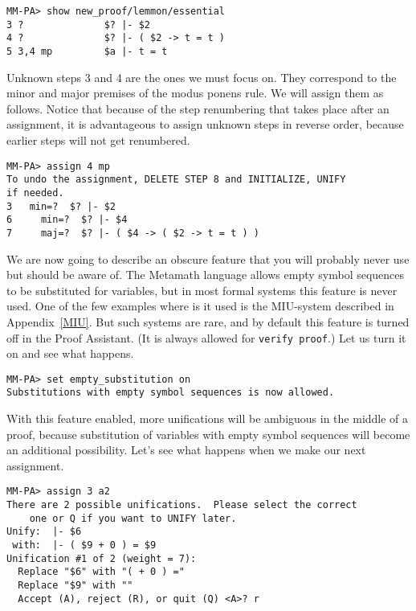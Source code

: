 \begin{verbatim}
MM-PA> show new_proof/lemmon/essential
3 ?              $? |- $2
4 ?              $? |- ( $2 -> t = t )
5 3,4 mp         $a |- t = t
\end{verbatim}

Unknown steps 3 and 4 are the ones we must focus on.  They correspond to the
minor and major premises of the modus ponens rule.  We will assign them as
follows.  Notice that because of the step renumbering that takes place
after an assignment, it is advantageous to assign unknown steps in reverse
order, because earlier steps will not get renumbered.

\begin{verbatim}
MM-PA> assign 4 mp
To undo the assignment, DELETE STEP 8 and INITIALIZE, UNIFY
if needed.
3   min=?  $? |- $2
6     min=?  $? |- $4
7     maj=?  $? |- ( $4 -> ( $2 -> t = t ) )
\end{verbatim}

We are now going to describe an obscure feature that you will probably
never use but should be aware of.  The Metamath language allows empty
symbol sequences to be substituted for variables, but in most formal
systems this feature is never used.  One of the few examples where is it
used is the MIU-system described in
Appendix~\ref{MIU}.  But such systems are rare, and by default this
feature is turned off in the Proof Assistant.  (It is always allowed for
{\tt verify proof}.)  Let us turn it on and see what
happens.

\begin{verbatim}
MM-PA> set empty_substitution on
Substitutions with empty symbol sequences is now allowed.
\end{verbatim}

With this feature enabled, more unifications will be
ambiguous in
the middle of a proof, because
substitution
of variables with empty symbol sequences will become an additional
possibility.  Let's see what happens when we make our next assignment.

\begin{verbatim}
MM-PA> assign 3 a2
There are 2 possible unifications.  Please select the correct
    one or Q if you want to UNIFY later.
Unify:  |- $6
 with:  |- ( $9 + 0 ) = $9
Unification #1 of 2 (weight = 7):
  Replace "$6" with "( + 0 ) ="
  Replace "$9" with ""
  Accept (A), reject (R), or quit (Q) <A>? r
\end{verbatim}

